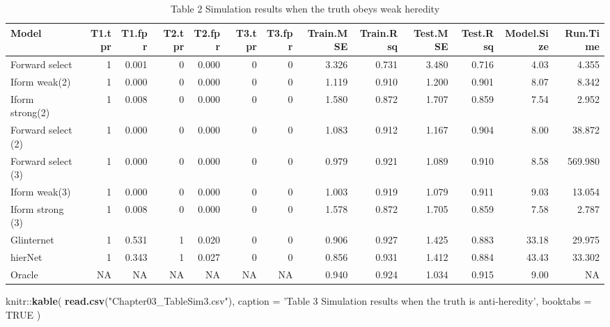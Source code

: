 \documentclass[11pt,]{book}
\newenvironment{Shaded}{\begin{snugshade}}{\end{snugshade}}
\newcommand{\KeywordTok}[1]{\textcolor[rgb]{0.13,0.29,0.53}{\textbf{{#1}}}}
\newcommand{\DataTypeTok}[1]{\textcolor[rgb]{0.13,0.29,0.53}{{#1}}}
\newcommand{\StringTok}[1]{\textcolor[rgb]{0.31,0.60,0.02}{{#1}}}
\newcommand{\OtherTok}[1]{\textcolor[rgb]{0.56,0.35,0.01}{{#1}}}
\newcommand{\NormalTok}[1]{{#1}}
\theoremstyle{definition}
\theoremstyle{definition}
\theoremstyle{remark}
\begin{document}
\begin{table}

\caption{\label{tab:Chap3sim2}Table 2 Simulation results when the truth obeys weak heredity}
\centering
\begin{tabular}[t]{lrrrrrrrrrrrr}
\toprule
Model & T1.tpr & T1.fpr & T2.tpr & T2.fpr & T3.tpr & T3.fpr & Train.MSE & Train.Rsq & Test.MSE & Test.Rsq & Model.Size & Run.Time\\
\midrule
Forward select & 1 & 0.001 & 0 & 0.000 & 0 & 0 & 3.326 & 0.731 & 3.480 & 0.716 & 4.03 & 4.355\\
Iform weak(2) & 1 & 0.000 & 0 & 0.000 & 0 & 0 & 1.119 & 0.910 & 1.200 & 0.901 & 8.07 & 8.342\\
Iform strong(2) & 1 & 0.008 & 0 & 0.000 & 0 & 0 & 1.580 & 0.872 & 1.707 & 0.859 & 7.54 & 2.952\\
Forward select (2) & 1 & 0.000 & 0 & 0.000 & 0 & 0 & 1.083 & 0.912 & 1.167 & 0.904 & 8.00 & 38.872\\
Forward select (3) & 1 & 0.000 & 0 & 0.000 & 0 & 0 & 0.979 & 0.921 & 1.089 & 0.910 & 8.58 & 569.980\\
\addlinespace
Iform weak(3) & 1 & 0.000 & 0 & 0.000 & 0 & 0 & 1.003 & 0.919 & 1.079 & 0.911 & 9.03 & 13.054\\
Iform strong (3) & 1 & 0.008 & 0 & 0.000 & 0 & 0 & 1.578 & 0.872 & 1.705 & 0.859 & 7.58 & 2.787\\
Glinternet & 1 & 0.531 & 1 & 0.020 & 0 & 0 & 0.906 & 0.927 & 1.425 & 0.883 & 33.18 & 29.975\\
hierNet & 1 & 0.343 & 1 & 0.027 & 0 & 0 & 0.856 & 0.931 & 1.412 & 0.884 & 43.43 & 33.302\\
Oracle & NA & NA & NA & NA & NA & NA & 0.940 & 0.924 & 1.034 & 0.915 & 9.00 & NA\\
\bottomrule
\end{tabular}
\end{table}

\begin{Shaded}
\begin{Highlighting}[]
\NormalTok{knitr::}\KeywordTok{kable}\NormalTok{(}
  \KeywordTok{read.csv}\NormalTok{(}\StringTok{"Chapter03_TableSim3.csv"}\NormalTok{), }\DataTypeTok{caption =} \StringTok{'Table 3 Simulation results when the truth is anti-heredity'}\NormalTok{,}
  \DataTypeTok{booktabs =} \OtherTok{TRUE}
\NormalTok{)}
\end{Highlighting}
\end{Shaded}
\end{document}
